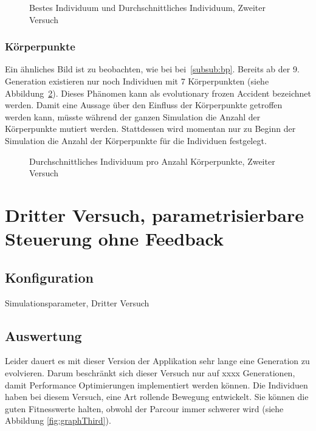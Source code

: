         \begin{figure}
          
          \caption{Bestes Individuum und Durchschnittliches Individuum, Zweiter Versuch\label{fig:graphSecond}}
        \end{figure}

      \subsubsection{Körperpunkte\label{subsub:bpScnd}}

        Ein ähnliches Bild ist zu beobachten, wie bei bei~\ref{subsub:bp}.
        Bereits ab der 9\@. Generation existieren nur noch Individuen mit 7 Körperpunkten (siehe Abbildung~\ref{fig:graphBpSecond}).
        Dieses Phänomen kann als evolutionary frozen Accident bezeichnet werden.
        Damit eine Aussage über den Einfluss der Körperpunkte getroffen werden kann,
        müsste während der ganzen Simulation die Anzahl der Körperpunkte mutiert werden.
        Stattdessen wird momentan nur zu Beginn der Simulation die Anzahl der Körperpunkte für die Individuen festgelegt.

        \begin{figure}
          
          \caption{Durchschnittliches Individuum pro Anzahl Körperpunkte, Zweiter Versuch\label{fig:graphBpSecond}}
        \end{figure}

    \section{Dritter Versuch, parametrisierbare Steuerung ohne Feedback}

      \subsection{Konfiguration}

        \begin{table}[H]
          
          \caption{Simulationsparameter, Dritter Versuch}
        \end{table}

      \subsection{Auswertung}
        Leider dauert es mit dieser Version der Applikation sehr lange eine Generation zu evolvieren.
        Darum beschränkt sich dieser Versuch nur auf xxxx Generationen, damit Performance Optimierungen implementiert werden können.
        Die Individuen haben bei diesem Versuch, eine Art rollende Bewegung entwickelt.
        Sie können die guten Fitnesswerte halten, obwohl der Parcour immer schwerer wird (siehe Abbildung \ref{fig:graphThird}).


